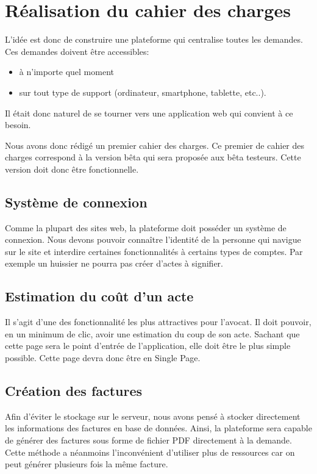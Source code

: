 \documentclass[]{report}
\begin{document}
  \section{Réalisation du cahier des charges}

    L'idée est donc de construire une plateforme qui centralise toutes les demandes. Ces demandes doivent être accessibles:

    \begin{itemize}
      \item à n'importe quel moment
      \item sur tout type de support (ordinateur, smartphone, tablette, etc..).
    \end{itemize}

    Il était donc naturel de se tourner vers une application web qui convient à ce besoin.

    Nous avons donc rédigé un premier cahier des charges. Ce premier de cahier des charges correspond à la version bêta qui sera proposée aux bêta testeurs. Cette version doit donc être fonctionnelle.

    \subsection{Système de connexion}

      Comme la plupart des sites web, la plateforme doit posséder un système de connexion. Nous devons pouvoir connaître l’identité de la personne qui navigue sur le site et interdire certaines fonctionnalités à certains types de comptes. Par exemple un huissier ne pourra pas créer d'actes à signifier.

    \subsection{Estimation du coût d'un acte}

      Il s'agit d'une des fonctionnalité les plus attractives pour l'avocat. Il doit pouvoir, en un minimum de clic, avoir une estimation du coup de son acte. Sachant que cette page sera le point d'entrée de l'application, elle doit être le plus simple possible. Cette page devra donc être en Single Page.

    \subsection{Création des factures}

      Afin d'éviter le stockage sur le serveur, nous avons pensé à stocker directement les informations des factures en base de données. Ainsi, la plateforme sera capable de générer des factures sous forme de fichier PDF directement à la demande. Cette méthode a néanmoins l'inconvénient d'utiliser plus de ressources car on peut générer plusieurs fois la même facture.
\end{document}
